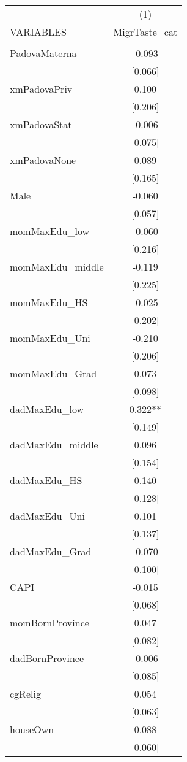 \documentclass[]{article}
\begin{document}
\begin{tabular}{lc} \hline
 & (1) \\
VARIABLES & MigrTaste\_cat \\ \hline
 &  \\
PadovaMaterna & -0.093 \\
 & [0.066] \\
xmPadovaPriv & 0.100 \\
 & [0.206] \\
xmPadovaStat & -0.006 \\
 & [0.075] \\
xmPadovaNone & 0.089 \\
 & [0.165] \\
Male & -0.060 \\
 & [0.057] \\
momMaxEdu\_low & -0.060 \\
 & [0.216] \\
momMaxEdu\_middle & -0.119 \\
 & [0.225] \\
momMaxEdu\_HS & -0.025 \\
 & [0.202] \\
momMaxEdu\_Uni & -0.210 \\
 & [0.206] \\
momMaxEdu\_Grad & 0.073 \\
 & [0.098] \\
dadMaxEdu\_low & 0.322** \\
 & [0.149] \\
dadMaxEdu\_middle & 0.096 \\
 & [0.154] \\
dadMaxEdu\_HS & 0.140 \\
 & [0.128] \\
dadMaxEdu\_Uni & 0.101 \\
 & [0.137] \\
dadMaxEdu\_Grad & -0.070 \\
 & [0.100] \\
CAPI & -0.015 \\
 & [0.068] \\
momBornProvince & 0.047 \\
 & [0.082] \\
dadBornProvince & -0.006 \\
 & [0.085] \\
cgRelig & 0.054 \\
 & [0.063] \\
houseOwn & 0.088 \\
 & [0.060] \\

\end{tabular}
\end{document}
